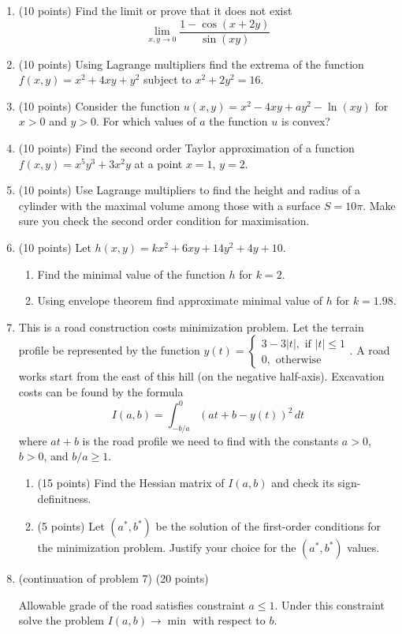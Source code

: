 \begin{enumerate}
  \item (10 points) Find the limit or prove that it does not exist
  \[
  \lim_{x,y \to 0} \frac{1 - \cos(x+2y)}{\sin(xy)}
  \]

  \item (10 points) Using Lagrange multipliers find the extrema of the function $f(x,y) = x^2 + 4xy + y^2$ subject to $x^2 + 2y^2 = 16$.

 \item (10 points) Consider the function $u(x,y) = x^2 - 4xy + ay^2 -\ln(xy)$ for $x>0$ and $y>0$.
 For which values of $a$ the function $u$ is convex?

 \item (10 points) Find the second order Taylor approximation of a function $f(x,y) = x^5y^3 + 3x^2y$ at a point $x=1$, $y=2$.

  \item (10 points) Use Lagrange multipliers to find the height and radius of a cylinder
  with the maximal volume among those with a surface $S=10\pi$. Make sure you check the second order
condition for maximisation.

  \item (10 points) Let $h(x, y) = kx^2 + 6xy + 14y^2 + 4y + 10$.
  \begin{enumerate}
    \item Find the minimal value of the function $h$ for $k=2$.
    \item Using envelope theorem find approximate minimal value of $h$ for $k=1.98$.
  \end{enumerate}


\item This is a road construction costs minimization problem. Let the terrain profile be represented by the function $y(t)=\begin{cases}
3-3|t|, \text{ if } |t|\leq 1\\
0, \text{ otherwise}
\end{cases}$.
A road works start from the east of this hill (on the negative half-axis). Excavation costs can be found by the formula
\[
I(a, b) = \int_{-b/a}^0 (at + b - y(t))^2 \, dt
\]
where $at+b$  is the road profile we need to find with the constants $a>0$, $b>0$, and $b/a\geq 1$.
\begin{enumerate}
  \item (15 points) Find the Hessian matrix of $I(a,b)$ and check its sign-definitness.
  \item (5 points) Let $(a^*, b^*)$ be the solution of the first-order conditions for the minimization problem.
  Justify your choice for the $(a^*, b^*)$ values.
\end{enumerate}

\item (continuation of problem 7) (20 points)

Allowable grade of the road satisfies constraint $a\leq 1$. Under this constraint solve the problem $I(a, b) \to \min$ with respect to $b$.

\end{enumerate}


